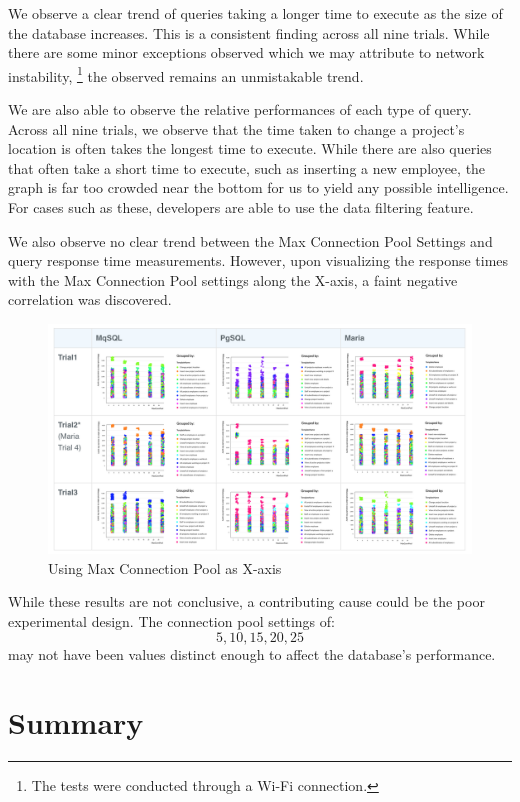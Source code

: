 \documentclass[12pt]{article}
\begin{document}
\begin{spacing}{1.9}
	We observe a clear trend of queries taking a longer time to execute as the size of the database increases. This is a consistent finding across all nine trials. While there are some minor exceptions observed which we may attribute to network instability, \footnote{The tests were conducted through a Wi-Fi connection.} the observed remains an unmistakable trend.
	
	We are also able to observe the relative performances of each type of query. Across all nine trials, we observe that the time taken to change a project's location is often takes the longest time to execute. While there are also queries that often take a short time to execute, such as inserting a new employee, the graph is far too crowded near the bottom for us to yield any possible intelligence. For cases such as these, developers are able to use the data filtering feature.
	
	We also observe no clear trend between the Max Connection Pool Settings and query response time measurements. However, upon visualizing the response times with the Max Connection Pool settings along the X-axis, a faint negative correlation was discovered.
	
	\begin{figure}[H]
		\centering
		\includegraphics[width=\textwidth]{MCP.png}
		\caption{Using Max Connection Pool as X-axis }
		
	\end{figure}
	
	While these results are not conclusive, a contributing cause could be the poor experimental design. The connection pool settings of: \[5,10,15,20,25\] may not have been values distinct enough to affect the database's performance.
	
	\clearpage
	\section{Summary}
	

\end{spacing}
\end{document}

